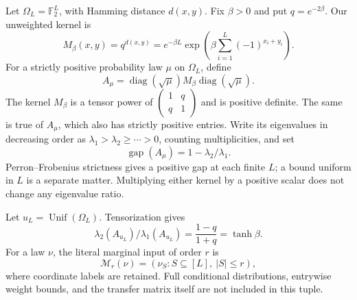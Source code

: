 \documentclass[11pt]{article}
\newcommand{\F}{\mathbb F}
\newcommand{\diag}{\operatorname{diag}}
\newcommand{\gap}{\operatorname{gap}}
\newcommand{\Unif}{\operatorname{Unif}}
\begin{document}
Let $\Omega_L=\F_2^L$, with Hamming distance $d(x,y)$. Fix $\beta>0$ and put
$q=e^{-2\beta}$. Our unweighted kernel is
\begin{equation}\label{eq:kernel}
 M_\beta(x,y)=q^{d(x,y)}
 =e^{-\beta L}\exp\!\left(\beta\sum_{i=1}^L(-1)^{x_i+y_i}\right).
\end{equation}
For a strictly positive probability law $\mu$ on $\Omega_L$, define
\begin{equation}\label{eq:weighted}
 A_\mu=\diag(\sqrt\mu)M_\beta\diag(\sqrt\mu).
\end{equation}
The kernel $M_\beta$ is a tensor power of
$\left(\begin{smallmatrix}1&q\\q&1\end{smallmatrix}\right)$ and is positive
definite. The same is true of $A_\mu$, which also has strictly positive
entries. Write its eigenvalues in decreasing order as
$\lambda_1>\lambda_2\ge\cdots>0$, counting multiplicities, and set
\[
 \gap(A_\mu)=1-\lambda_2/\lambda_1.
\]
Perron--Frobenius strictness gives a positive gap at each finite $L$; a
bound uniform in $L$ is a separate matter. Multiplying either kernel by
a positive scalar does not change any eigenvalue ratio.

Let $u_L=\Unif(\Omega_L)$. Tensorization gives
\begin{equation}\label{eq:product}
 \lambda_2(A_{u_L})/\lambda_1(A_{u_L})
       =\frac{1-q}{1+q}=\tanh\beta.
\end{equation}
For a law $\nu$, the literal marginal input of order $r$ is
\begin{equation}\label{eq:input}
 \mathcal M_r(\nu)=(\nu_S:S\subseteq[L],\ |S|\le r),
\end{equation}
where coordinate labels are retained. Full conditional distributions,
entrywise weight bounds, and the transfer matrix itself are not included
in this tuple.
\end{document}

